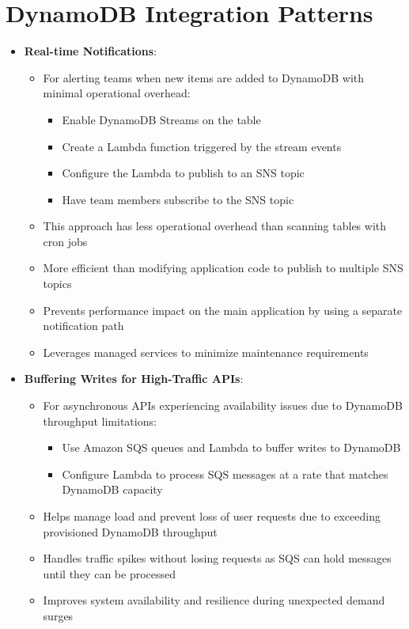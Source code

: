 \documentclass[11pt,a4paper]{report}
\begin{document}
\section{DynamoDB Integration Patterns}

\begin{itemize}
  \item \textbf{Real-time Notifications}:
\begin{itemize}
  \item For alerting teams when new items are added to DynamoDB with minimal operational overhead:
\begin{itemize}
  \item Enable DynamoDB Streams on the table
  \item Create a Lambda function triggered by the stream events
  \item Configure the Lambda to publish to an SNS topic
  \item Have team members subscribe to the SNS topic
\end{itemize}
  \item This approach has less operational overhead than scanning tables with cron jobs
  \item More efficient than modifying application code to publish to multiple SNS topics
  \item Prevents performance impact on the main application by using a separate notification path
  \item Leverages managed services to minimize maintenance requirements
\end{itemize}
  \item \textbf{Buffering Writes for High-Traffic APIs}:
\begin{itemize}
  \item For asynchronous APIs experiencing availability issues due to DynamoDB throughput limitations:
\begin{itemize}
  \item Use Amazon SQS queues and Lambda to buffer writes to DynamoDB
  \item Configure Lambda to process SQS messages at a rate that matches DynamoDB capacity
\end{itemize}
  \item Helps manage load and prevent loss of user requests due to exceeding provisioned DynamoDB throughput
  \item Handles traffic spikes without losing requests as SQS can hold messages until they can be processed
  \item Improves system availability and resilience during unexpected demand surges

\end{itemize}
\end{itemize}
\end{document}
